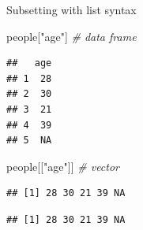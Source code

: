 \documentclass[ignorenonframetext,]{beamer}
\newenvironment{Shaded}{\begin{snugshade}}{\end{snugshade}}
\newcommand{\CommentTok}[1]{\textcolor[rgb]{0.56,0.35,0.01}{\textit{#1}}}
\newcommand{\NormalTok}[1]{#1}
\newcommand{\OperatorTok}[1]{\textcolor[rgb]{0.81,0.36,0.00}{\textbf{#1}}}
\newcommand{\StringTok}[1]{\textcolor[rgb]{0.31,0.60,0.02}{#1}}
\begin{document}
\begin{frame}[fragile]{Subsetting with list syntax}
\protect\hypertarget{subsetting-with-list-syntax-3}{}

\begin{Shaded}
\begin{Highlighting}[]
\NormalTok{people[}\StringTok{"age"}\NormalTok{] }\CommentTok{# data frame}
\end{Highlighting}
\end{Shaded}

\begin{verbatim}
##   age
## 1  28
## 2  30
## 3  21
## 4  39
## 5  NA
\end{verbatim}

\begin{Shaded}
\begin{Highlighting}[]
\NormalTok{people[[}\StringTok{"age"}\NormalTok{]] }\CommentTok{# vector}
\end{Highlighting}
\end{Shaded}

\begin{verbatim}
## [1] 28 30 21 39 NA
\end{verbatim}

\begin{Shaded}
\end{Shaded}

\begin{verbatim}
## [1] 28 30 21 39 NA
\end{verbatim}

\end{frame}
\end{document}
